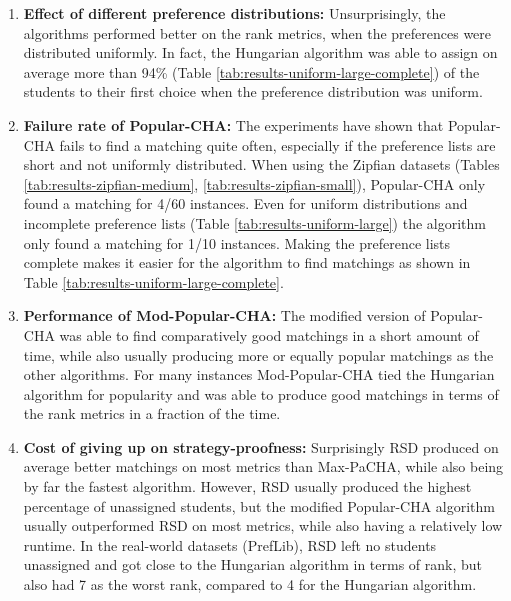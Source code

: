 \begin{enumerate}
  \item \textbf{Effect of different preference distributions:} Unsurprisingly, the algorithms performed better on the rank metrics, when the preferences were distributed uniformly. In fact, the Hungarian algorithm was able to assign on average more than 94\% (Table \ref{tab:results-uniform-large-complete}) of the students to their first choice when the preference distribution was uniform.
  \item \textbf{Failure rate of Popular-CHA:} The experiments have shown that \mbox{Popular-CHA} fails to find a matching quite often, especially if the preference lists are short and not uniformly distributed. When using the Zipfian datasets (Tables \ref{tab:results-zipfian-medium}, \ref{tab:results-zipfian-small}), Popular-CHA only found a matching for 4/60 instances. Even for uniform distributions and incomplete preference lists (Table \ref{tab:results-uniform-large}) the algorithm only found a matching for 1/10 instances. Making the preference lists complete makes it easier for the algorithm to find matchings as shown in Table \ref{tab:results-uniform-large-complete}.
  \item \textbf{Performance of Mod-Popular-CHA:} The modified version of Popular-CHA was able to find comparatively good matchings in a short amount of time, while also usually producing more or equally popular matchings as the other algorithms. For many instances Mod-Popular-CHA tied the Hungarian algorithm for popularity and was able to produce good matchings in terms of the rank metrics in a fraction of the time.
  \item \textbf{Cost of giving up on strategy-proofness:} Surprisingly RSD produced on average better matchings on most metrics than Max-PaCHA, while also being by far the fastest algorithm. However, RSD usually produced the highest percentage of unassigned students, but the modified Popular-CHA algorithm usually outperformed RSD on most metrics, while also having a relatively low runtime. In the real-world datasets (PrefLib), RSD left no students unassigned and got close to the Hungarian algorithm in terms of rank, but also had 7 as the worst rank, compared to 4 for the Hungarian algorithm. 

\end{enumerate}
